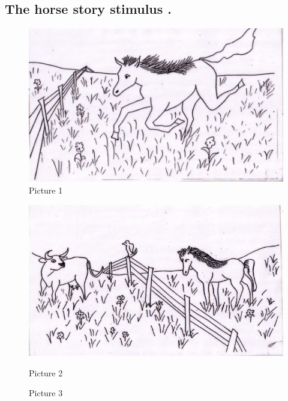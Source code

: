 \documentclass[output=paper,colorlinks,citecolor=brown,modfonts,nonflat]{../langscibook}
\begin{document}
\begin{paperappendix}
\section{The horse story stimulus \citep{Hickmann1982}.}

  
\begin{figure}
\includegraphics[width=\textwidth]{figures/leclerq-img001.png}
Picture 1
\end{figure}




\begin{figure}
\includegraphics[width=\textwidth]{figures/leclerq-img002.png}


Picture 2


\end{figure}


\begin{figure}
Picture 3



\end{figure}
\end{paperappendix}
\end{document}

